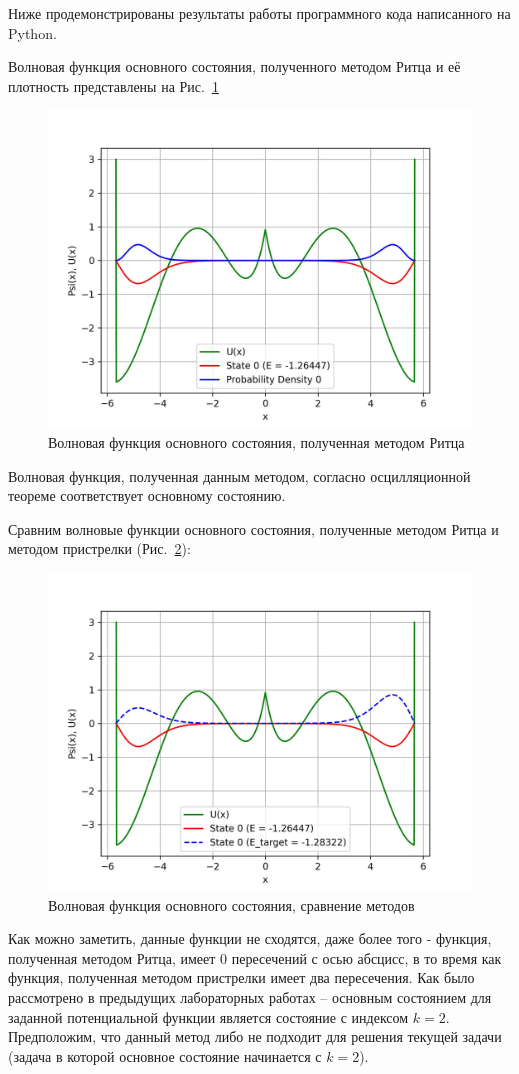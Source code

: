 Ниже продемонстрированы результаты работы программного кода написанного на Python.


Волновая функция основного состояния, полученного методом Ритца и её плотность представлены на Рис.~\ref{fig:State0PB}

\graphicspath{{../python_results}}

\begin{figure}[h]
\centering
    \includegraphics[width=0.6\linewidth]{State 0 probability density}
    \caption{Волновая функция основного состояния, полученная методом Ритца}\label{fig:State0PB}
\end{figure}

Волновая функция, полученная данным методом, согласно осцилляционной теореме соответствует основному состоянию.

Сравним волновые функции основного состояния, полученные методом Ритца и методом пристрелки (Рис.~\ref{fig:State0}):

\begin{figure}[h]
\centering
    \includegraphics[width=0.6\linewidth]{State 0}
    \caption{Волновая функция основного состояния, сравнение методов}\label{fig:State0}
\end{figure}


Как можно заметить, данные функции не сходятся, даже более того - функция, полученная методом Ритца, имеет 0 пересечений с осью абсцисс,
в то время как функция, полученная методом пристрелки имеет два пересечения.
Как было рассмотрено в предыдущих лабораторных работах -- основным состоянием для заданной потенциальной функции является состояние с индексом $k=2$.
Предположим, что данный метод либо не подходит для решения текущей задачи (задача в которой основное состояние начинается с $k=2$).

